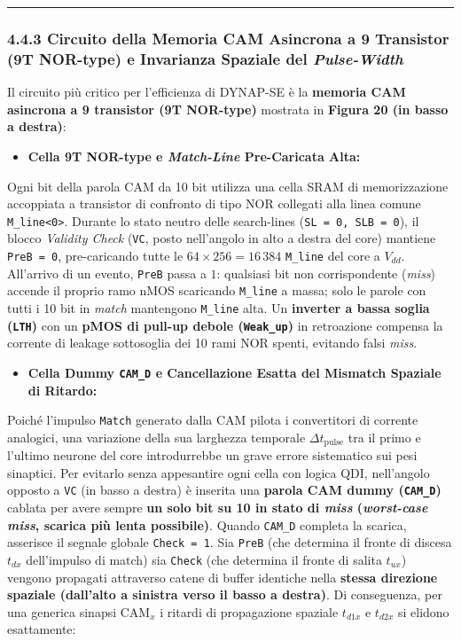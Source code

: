 \documentclass[11pt,a4paper]{article}
\begin{document}
\bigskip\hrule\bigskip

\subsubsection{4.4.3 Circuito della Memoria CAM Asincrona a 9 Transistor (9T NOR-type) e Invarianza Spaziale del \textit{Pulse-Width}}

Il circuito più critico per l'efficienza di DYNAP-SE è la \textbf{memoria CAM asincrona a 9 transistor (9T NOR-type)} mostrata in \textbf{Figura 20 (in basso a destra)}:
\begin{itemize}
  \item \textbf{Cella 9T NOR-type e \textit{Match-Line} Pre-Caricata Alta:}
\end{itemize}
Ogni bit della parola CAM da 10 bit utilizza una cella SRAM di memorizzazione accoppiata a transistor di confronto di tipo NOR collegati alla linea comune \texttt{M\_line<0>}. Durante lo stato neutro delle search-lines (\texttt{SL = 0, SLB = 0}), il blocco \textit{Validity Check} (\texttt{VC}, posto nell'angolo in alto a destra del core) mantiene \texttt{PreB = 0}, pre-caricando tutte le $64 \times 256 = 16\,384$ \texttt{M\_line} del core a $V_{dd}$. All'arrivo di un evento, \texttt{PreB} passa a $1$: qualsiasi bit non corrispondente (\textit{miss}) accende il proprio ramo nMOS scaricando \texttt{M\_line} a massa; solo le parole con tutti i 10 bit in \textit{match} mantengono \texttt{M\_line} alta. Un \textbf{inverter a bassa soglia (\texttt{LTH})} con un \textbf{pMOS di pull-up debole (\texttt{Weak\_up})} in retroazione compensa la corrente di leakage sottosoglia dei 10 rami NOR spenti, evitando falsi \textit{miss}.
\begin{itemize}
  \item \textbf{Cella Dummy \texttt{CAM\_D} e Cancellazione Esatta del Mismatch Spaziale di Ritardo:}
\end{itemize}
Poiché l'impulso \texttt{Match} generato dalla CAM pilota i convertitori di corrente analogici, una variazione della sua larghezza temporale $\Delta t_{\text{pulse}}$ tra il primo e l'ultimo neurone del core introdurrebbe un grave errore sistematico sui pesi sinaptici. Per evitarlo senza appesantire ogni cella con logica QDI, nell'angolo opposto a \texttt{VC} (in basso a destra) è inserita una \textbf{parola CAM dummy (\texttt{CAM\_D})} cablata per avere sempre \textbf{un solo bit su 10 in stato di \textit{miss} (\textit{worst-case miss}, scarica più lenta possibile)}. Quando \texttt{CAM\_D} completa la scarica, asserisce il segnale globale \texttt{Check = 1}. Sia \texttt{PreB} (che determina il fronte di discesa $t_{dx}$ dell'impulso di match) sia \texttt{Check} (che determina il fronte di salita $t_{ux}$) vengono propagati attraverso catene di buffer identiche nella \textbf{stessa direzione spaziale (dall'alto a sinistra verso il basso a destra)}. Di conseguenza, per una generica sinapsi $\text{CAM}_x$ i ritardi di propagazione spaziale $t_{d1x}$ e $t_{d2x}$ si elidono esattamente:
\end{document}
